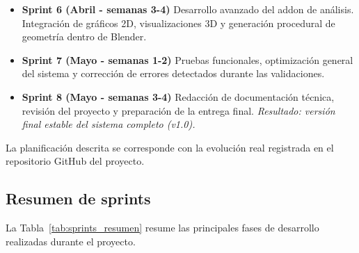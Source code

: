 \begin{itemize}
    \item \textbf{Sprint 6 (Abril - semanas 3-4)}  
    Desarrollo avanzado del addon de análisis. Integración de gráficos 2D, visualizaciones 3D y generación procedural de geometría dentro de Blender.

    \item \textbf{Sprint 7 (Mayo - semanas 1-2)}  
    Pruebas funcionales, optimización general del sistema y corrección de errores detectados durante las validaciones.

    \item \textbf{Sprint 8 (Mayo - semanas 3-4)}  
    Redacción de documentación técnica, revisión del proyecto y preparación de la entrega final.  
    \textit{Resultado: versión final estable del sistema completo (v1.0).}

\end{itemize}

La planificación descrita se corresponde con la evolución real registrada en el repositorio GitHub del proyecto.

\subsection{Resumen de sprints}

La Tabla~\ref{tab:sprints_resumen} resume las principales fases de desarrollo realizadas durante el proyecto.

